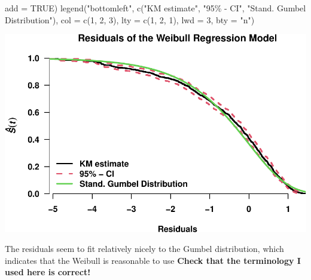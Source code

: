 \documentclass[
]{article}
\newenvironment{Shaded}{\begin{snugshade}}{\end{snugshade}}
\newcommand{\AttributeTok}[1]{\textcolor[rgb]{0.77,0.63,0.00}{#1}}
\newcommand{\ConstantTok}[1]{\textcolor[rgb]{0.00,0.00,0.00}{#1}}
\newcommand{\DecValTok}[1]{\textcolor[rgb]{0.00,0.00,0.81}{#1}}
\newcommand{\FunctionTok}[1]{\textcolor[rgb]{0.00,0.00,0.00}{#1}}
\newcommand{\NormalTok}[1]{#1}
\newcommand{\SpecialCharTok}[1]{\textcolor[rgb]{0.00,0.00,0.00}{#1}}
\newcommand{\StringTok}[1]{\textcolor[rgb]{0.31,0.60,0.02}{#1}}
\begin{document}
\begin{Shaded}
\begin{Highlighting}[]
      \AttributeTok{add =} \ConstantTok{TRUE}\NormalTok{)}
\FunctionTok{legend}\NormalTok{(}\StringTok{"bottomleft"}\NormalTok{, }\FunctionTok{c}\NormalTok{(}\StringTok{"KM estimate"}\NormalTok{, }\StringTok{"95\% {-} CI"}\NormalTok{, }\StringTok{"Stand. Gumbel Distribution"}\NormalTok{),}
       \AttributeTok{col =} \FunctionTok{c}\NormalTok{(}\DecValTok{1}\NormalTok{, }\DecValTok{2}\NormalTok{, }\DecValTok{3}\NormalTok{), }\AttributeTok{lty =} \FunctionTok{c}\NormalTok{(}\DecValTok{1}\NormalTok{, }\DecValTok{2}\NormalTok{, }\DecValTok{1}\NormalTok{), }\AttributeTok{lwd =} \DecValTok{3}\NormalTok{, }\AttributeTok{bty =} \StringTok{"n"}\NormalTok{)}
\end{Highlighting}
\end{Shaded}

\includegraphics{practical_files/figure-latex/unnamed-chunk-14-1.pdf}

The residuals seem to fit relatively nicely to the Gumbel distribution, which indicates that the Weibull is reasonable to use \textbf{Check that the terminology I used here is correct!}

\begin{Shaded}
\end{Shaded}
\end{document}
